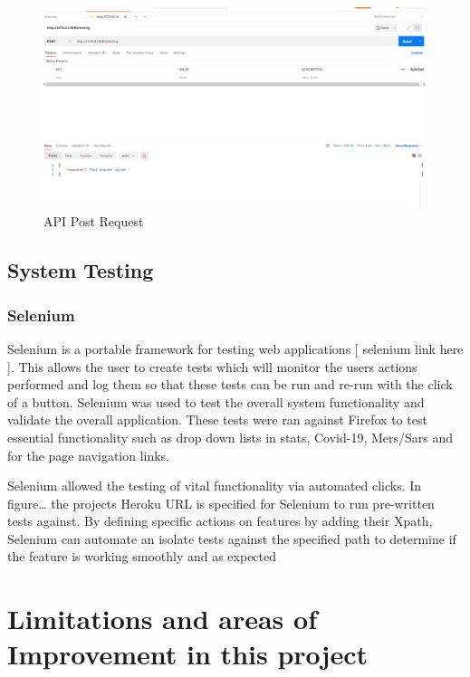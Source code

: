 \begin{figure}[ht]
    \centering
    \includegraphics[scale=0.33]{img/Testpost.PNG}
    \caption{API Post Request}
    \label{fig:my_label12}
\end{figure}



\subsection{System Testing}

\subsubsection{Selenium}
\cite{selenium}
Selenium is a portable framework for testing web applications [ selenium link here ]. This allows the user to create tests which will monitor the users actions performed and log them so that these tests can be run and re-run with the click of a button. Selenium was used to test the overall system functionality and validate the overall application. These tests were ran against Firefox to test essential functionality such as drop down lists in stats, Covid-19, Mers/Sars and for the page navigation links. 

Selenium allowed the testing of vital functionality via automated clicks. In figure… the projects Heroku URL is specified for Selenium to run pre-written tests against. By defining specific actions on features by adding their Xpath, Selenium can automate an isolate tests against the specified path to determine if the feature is working smoothly and as expected 

\section{Limitations and areas of Improvement in this project}

